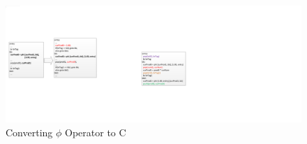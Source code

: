 \begin{figure}[htp]
\begin{center}
\includegraphics[width=0.7\linewidth]{chap3fig/SSA2C.pdf}
\caption{Converting $\phi$ Operator to C
\label{fig:phi2c}}
\end{center}
\end{figure}



